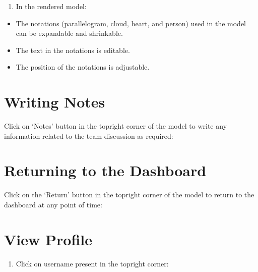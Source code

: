 \documentclass[letterpaper,10pt,english]{jupyterBook}
\begin{document}
\sphinxAtStartPar
{}
\begin{enumerate}
%
\item {} 
\sphinxAtStartPar
In the rendered model:

\end{enumerate}
\begin{itemize}
\item {} 
\sphinxAtStartPar
The notations (parallelogram, cloud, heart, and person) used in the
model can be expandable and shrinkable.

\item {} 
\sphinxAtStartPar
The text in the notations is editable.

\item {} 
\sphinxAtStartPar
The position of the notations is adjustable.

\end{itemize}


\section{Writing Notes}
\label{\detokenize{appendices/appendix_b/motivational_model_guide:writing-notes}}
\sphinxAtStartPar
Click on ‘Notes’ button in the top\sphinxhyphen{}right corner of the model to write
any information related to the team discussion as required:

\sphinxAtStartPar
{}


\section{Returning to the Dashboard}
\label{\detokenize{appendices/appendix_b/motivational_model_guide:returning-to-the-dashboard}}
\sphinxAtStartPar
Click on the ‘Return’ button in the top\sphinxhyphen{}right corner of the model to
return to the dashboard at any point of time:

\sphinxAtStartPar
{}


\section{View Profile}
\label{\detokenize{appendices/appendix_b/motivational_model_guide:view-profile}}\begin{enumerate}
%
\item {} 
\sphinxAtStartPar
Click on username present in the top\sphinxhyphen{}right corner:

\end{enumerate}
\end{document}
